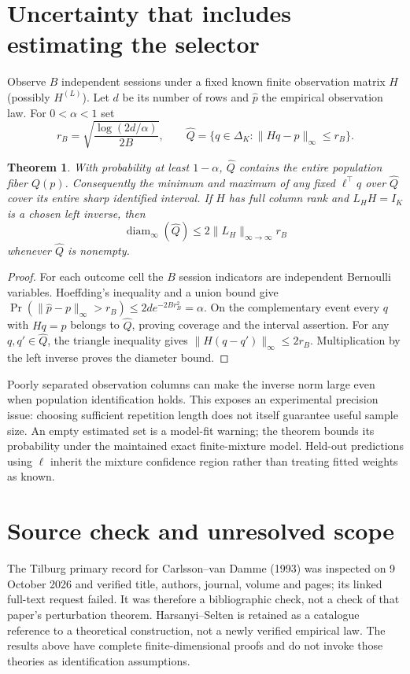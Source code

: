 \documentclass[11pt]{article}
\newtheorem{theorem}{Theorem}
\theoremstyle{remark}
\begin{document}
\section{Uncertainty that includes estimating the selector}
Observe $B$ independent sessions under a fixed known finite observation matrix $H$ (possibly $H^{(L)}$). Let $d$ be its number of rows and $\widehat p$ the empirical observation law. For $0<\alpha<1$ set
\[
 r_B=\sqrt{\frac{\log(2d/\alpha)}{2B}},\qquad
 \widehat Q=\{q\in\Delta_K:\|Hq-\widehat p\|_\infty\leq r_B\}.
\]
\begin{theorem}\label{inference}
With probability at least $1-\alpha$, $\widehat Q$ contains the entire population fiber $Q(p)$. Consequently the minimum and maximum of any fixed $\ell^\top q$ over $\widehat Q$ cover its entire sharp identified interval. If $H$ has full column rank and $L_HH=I_K$ is a chosen left inverse, then
\[
 \operatorname{diam}_{\infty}(\widehat Q)
 \leq2\|L_H\|_{\infty\to\infty}r_B
\]
whenever $\widehat Q$ is nonempty.
\end{theorem}
\begin{proof}
For each outcome cell the $B$ session indicators are independent Bernoulli variables. Hoeffding's inequality and a union bound give
$\Pr(\|\widehat p-p\|_\infty>r_B)\leq2d e^{-2Br_B^2}=\alpha$.
On the complementary event every $q$ with $Hq=p$ belongs to $\widehat Q$, proving coverage and the interval assertion. For any $q,q'\in\widehat Q$, the triangle inequality gives $\|H(q-q')\|_\infty\leq2r_B$. Multiplication by the left inverse proves the diameter bound.
\end{proof}

Poorly separated observation columns can make the inverse norm large even when population identification holds. This exposes an experimental precision issue: choosing sufficient repetition length does not itself guarantee useful sample size. An empty estimated set is a model-fit warning; the theorem bounds its probability under the maintained exact finite-mixture model. Held-out predictions using $\ell$ inherit the mixture confidence region rather than treating fitted weights as known.

\section{Source check and unresolved scope}
The Tilburg primary record for Carlsson--van Damme (1993) was inspected on 9 October 2026 and verified title, authors, journal, volume and pages; its linked full-text request failed. It was therefore a bibliographic check, not a check of that paper's perturbation theorem. Harsanyi--Selten is retained as a catalogue reference to a theoretical construction, not a newly verified empirical law. The results above have complete finite-dimensional proofs and do not invoke those theories as identification assumptions.
\end{document}
